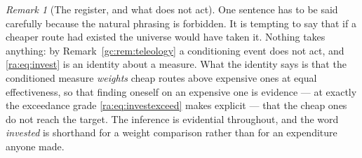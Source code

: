 \documentclass[11pt]{article}
\numberwithin{equation}{section}
\theoremstyle{plain}
\theoremstyle{definition}
\theoremstyle{remark}
\newtheorem{remark}[theorem]{Remark}
\begin{document}
\begin{remark}[The register, and what does not act]\label{ra:rem:investreg}
One sentence has to be said carefully because the natural phrasing is
forbidden. It is tempting to say that if a cheaper route had existed the
universe would have taken it. Nothing takes anything: by
Remark~\ref{gc:rem:teleology} a conditioning event does not act, and
\eqref{ra:eq:invest} is an identity about a measure. What the identity
says is that the conditioned measure \emph{weights} cheap routes above
expensive ones at equal effectiveness, so that finding oneself on an
expensive one is evidence --- at exactly the exceedance grade
\eqref{ra:eq:investexceed} makes explicit --- that the cheap ones do not
reach the target. The inference is evidential throughout, and the word
\emph{invested} is shorthand for a weight comparison rather than for an
expenditure anyone made.
\end{remark}
\end{document}
